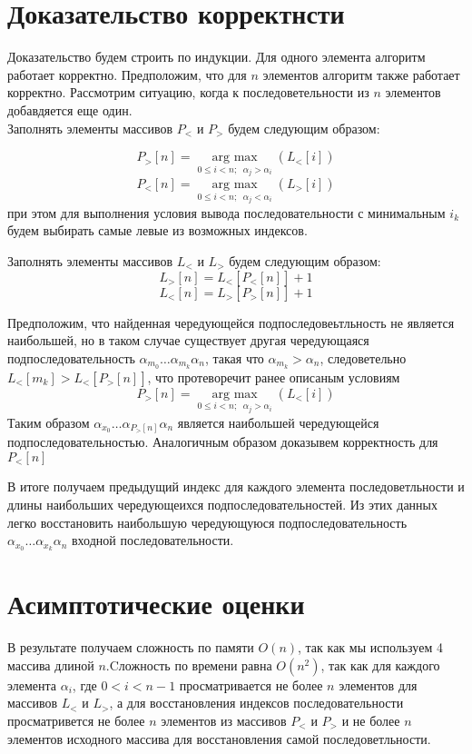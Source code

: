 \documentclass[12pt]{article}
\begin{document}
\section{Доказательство корректнсти}
Доказательство будем строить по индукции. Для одного элемента алгоритм работает корректно. Предположим, что для $n$ элементов алгоритм также работает корректно. Рассмотрим ситуацию, когда к последоветельности из $n$ элементов добавдяется еще один.\\
Заполнять элементы массивов $P_<$ и $P_>$ будем следующим образом:

$$P_>[n]=\operatorname*{arg\ max}\limits_{0\le i < n;\;\; \alpha_j>\alpha_i} (L_<[i])$$
$$P_<[n]=\operatorname*{arg\ max}\limits_{0\le i < n;\;\; \alpha_j<\alpha_i} (L_>[i])$$
при этом для выполнения условия вывода последовательности с минимальным $i_k$ будем выбирать самые левые из возможных индексов. 

Заполнять элементы массивов $L_<$ и $L_>$ будем следующим образом:
$$L_>[n] = L_<[P_<[n]] + 1$$
$$L_<[n] = L_>[P_>[n]] + 1$$

Предположим, что найденная чередующейся подпоследовеьтльность не является наибольшей, но в таком случае существует другая чередующаяся подпоследовательность $\alpha_{m_0}\dots\alpha_{m_k}\alpha_n $, такая что $\alpha_{m_k} > \alpha_n$, следоветельно $L_<[m_k] > L_<[P_>[n]]$, что протеворечит ранее описаным условиям 
$$P_>[n]=\operatorname*{arg\ max}\limits_{0\le i < n;\;\; \alpha_j>\alpha_i} (L_<[i])$$
Таким образом $\alpha_{x_0}\dots\alpha_{P_>[n]}\alpha_n$ является наибольшей чередующейся подпоследовательностью. Аналогичным образом доказывем корректность для $P_<[n]$

В итоге получаем предыдущий индекс для каждого элемента последоветльности и длины наибольших чередующеихся подпоследовательностей. Из этих данных легко восстановить наибольшую чередующуюся подпоследовательность $\alpha_{x_0}\dots\alpha_{x_k}\alpha_n$ входной последовательности.


\section{Асимптотические оценки}
В результате получаем сложность по памяти $O(n)$, так как мы используем 4 массива длиной $n$.Cложность по времени равна $O(n^2)$, так как для каждого элемента $\alpha_i$, где $0 < i < n-1$ просматривается не более $n$ элементов для массивов $L_<$ и $L_>$, а для восстановления индексов последовательности просматривется не более $n$ элементов из массивов $P_<$ и $P_>$ и не более $n$ элементов исходного массива для восстановления самой последоветльности.
\end{document}
